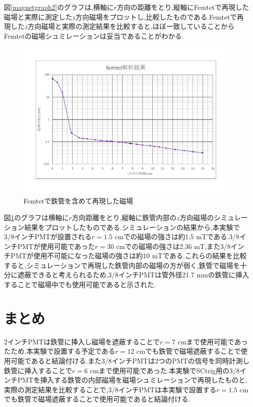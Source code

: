 図\ref{magnetgraph2}のグラフは,横軸に$r$方向の距離をとり,縦軸にFemtetで再現した磁場と実際に測定した$z$方向磁場をプロットし,比較したものである.Femtetで再現した$z$方向磁場と実際の測定結果を比較すると,ほぼ一致していることからFemtetの磁場シュミレーションは妥当であることがわかる.

\begin{figure}[tbp]
	\centering
		\includegraphics[width=15cm]{fig/iguchi/Femtetsaigengraph.pdf}
	\caption{Femtetで鉄管を含めて再現した磁場\newline}
	\label{Femtetsaigengraph}
\end{figure}

図\ref{Femtetsaigengraph}のグラフは横軸に$r$方向距離をとり,縦軸に鉄管内部の$z$方向磁場のシミュレーション結果をプロットしたものである.シミュレーションの結果から,本実験で3/8インチPMTが設置される$r=1.5$ cmでの磁場の強さは約1.5 mTである.3/8インチPMTが使用可能であった$r=30$ cmでの磁場の強さは2.36 mT,また3/8インチPMTが使用不可能になった磁場の強さは約10 mTである.これらの結果を比較すると,シミュレーションで再現した鉄管内部の磁場の方が弱く,鉄管で磁場を十分に遮蔽できると考えられるため,3/8インチPMTは管外径21.7 mmの鉄管に挿入することで磁場中でも使用可能であると示された.

\section{まとめ}
2インチPMTは鉄管に挿入し磁場を遮蔽することで$r=7$ cmまで使用可能であったため,本実験で設置する予定である$r=12$ cmでも鉄管で磁場遮蔽することで使用可能であると結論付ける.また3/8インチPMTは2つのPMTの信号を同時計測し鉄管に挿入することで$r=6$ cmまで使用可能であった.本実験でSCtrig用の3/8インチPMTを挿入する鉄管の内部磁場を磁場シュミレーションで再現したものと,実際の測定結果を比較することで,3/8インチPMTは本実験で設置する$r=1.5$ cmでも鉄管で磁場遮蔽することで使用可能であると結論付ける.



